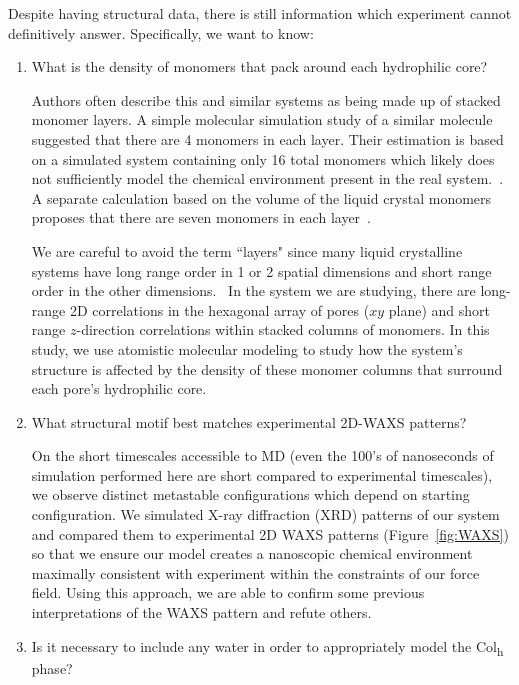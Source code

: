 \documentclass[journal=jpcbfk,manuscript=article]{achemso}
\begin{document}
 Despite having structural data, there is still information which experiment
 cannot definitively answer. Specifically, we want to know:
 \begin{enumerate}
    \item What is the density of monomers that pack around each hydrophilic core? 
    \label{point:monomernum}

	Authors often describe this and similar systems as being made up of
	stacked monomer layers. A simple molecular simulation study of a similar
	molecule suggested that there are 4 monomers in each layer. Their estimation is
	based on a simulated system containing only 16 total monomers which likely does
	not sufficiently model the chemical environment present in the real
	system.~\cite{zhu_methacrylated_2006}. A separate calculation based on the
	volume of the liquid crystal monomers proposes that there are seven monomers in
	each layer~\cite{resel_structural_2000}. 

	We are careful to avoid the term ``layers" since many liquid
	crystalline systems have long range order in 1 or 2 spatial dimensions and
	short range order in the other dimensions.~\cite{chaikin_principles_1995}  %
	In the system we are studying, there are long-range 2D correlations in
	the hexagonal array of pores ($xy$ plane) and short range $z$-direction
	correlations within stacked columns of monomers. In this study, we use
	atomistic molecular modeling to study how the system's structure is affected by
	the density of these monomer columns that surround each pore's hydrophilic
	core. 

	\item What structural motif best matches experimental 2D-WAXS patterns?\label{point:xrdmatch}

	On the short timescales accessible to MD (even the 100's of nanoseconds
	of simulation performed here are short compared to experimental timescales), we
	observe distinct metastable configurations which depend on starting
	configuration. We simulated X-ray diffraction (XRD) patterns of our system and
	compared them to experimental 2D WAXS patterns (Figure~\ref{fig:WAXS}) so that
	we ensure our model creates a nanoscopic chemical environment maximally
	consistent with experiment within the constraints of our force field. Using
	this approach, we are able to confirm some previous interpretations	of the
	WAXS pattern and refute others. 

        \item Is it necessary to include any water in order to appropriately model the 
        Col\textsubscript{h} phase? \label{point:water}


\end{enumerate}
\end{document}
